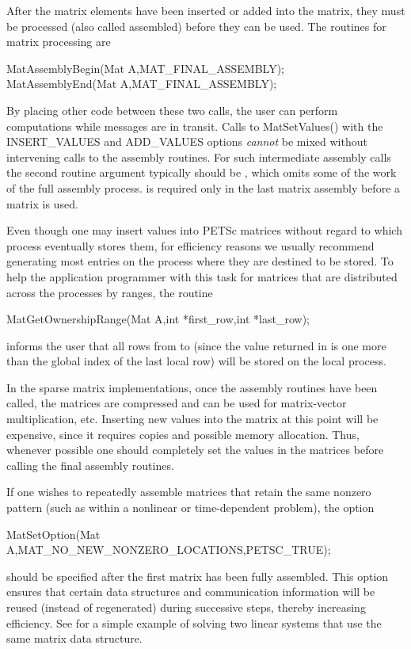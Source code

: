 After the matrix elements have been inserted or added into the matrix, 
they must be processed (also called assembled) before they can be used. The routines for matrix
processing are 
\begin{tabbing}
  MatAssemblyBegin(Mat A,MAT\_FINAL\_ASSEMBLY);\\
  MatAssemblyEnd(Mat A,MAT\_FINAL\_ASSEMBLY);
\end{tabbing}
By placing other code between these two calls, the user can perform
computations while messages are in transit.
Calls to MatSetValues() with the INSERT_VALUES and 
ADD_VALUES options {\em cannot} be mixed without intervening calls to
the assembly routines.  For such intermediate assembly calls the
second routine argument  typically should be ,
 which omits some of the work of the full 
assembly process.    is
required only in the last matrix assembly before a matrix is used.

Even though one may insert values into PETSc matrices without regard
to which process eventually stores them, for efficiency
reasons we usually recommend generating most entries on the
process where they are destined to be stored.  To help the
application programmer with this task for matrices that are
distributed across the processes by ranges, the routine
\begin{tabbing}
  MatGetOwnershipRange(Mat A,int *first\_row,int *last\_row);
\end{tabbing}
informs the user that all rows from  to 
 (since the value returned in  is one more
than the global index of the last local row) will be stored on the local process.

In the sparse matrix implementations, once the assembly routines have been 
called, the matrices are compressed and can be used for matrix-vector
multiplication, etc.
Inserting new values into the matrix at this point will be expensive, 
since it requires copies and possible memory allocation. Thus, whenever 
possible one should completely set the values in the matrices before 
calling the final assembly routines. 

If one wishes to repeatedly assemble matrices that retain the same
nonzero pattern (such as within a nonlinear or time-dependent
problem), the option
\begin{tabbing}
  MatSetOption(Mat A,MAT\_NO\_NEW\_NONZERO\_LOCATIONS,PETSC_TRUE);
\end{tabbing}
should be specified after the first matrix has been fully assembled.
This option ensures that certain data structures and communication
information will be reused (instead of regenerated) during successive
steps, thereby increasing efficiency.  
See  for a simple example of
solving two linear systems that use the same matrix data structure.

